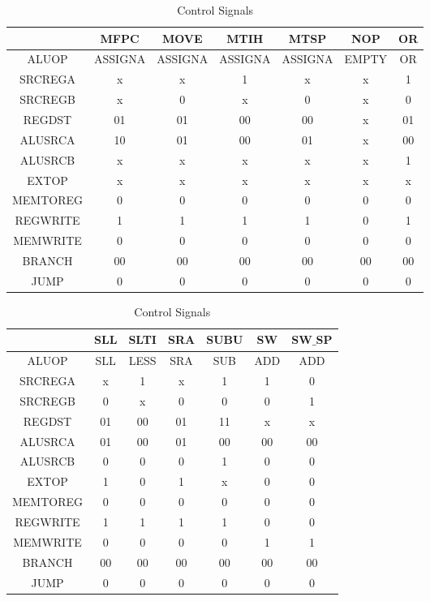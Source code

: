 \begin{center}
\begin{table}[H]
\caption{Control Signals}
\label{tab:treatments}
\begin{tabular}{|c|cccccc|}
\hline
& MFPC & MOVE & MTIH & MTSP & NOP & OR \\
\hline
ALUOP & ASSIGNA & ASSIGNA & ASSIGNA & ASSIGNA & EMPTY & OR\\	
\hline
SRCREGA & x & x & 1 & x & x & 1\\
\hline
SRCREGB & x & 0 & x & 0 & x & 0\\
\hline
REGDST & 01 & 01 & 00 & 00 & x & 01\\
\hline
ALUSRCA & 10 & 01 & 00 & 01 & x & 00\\
\hline
ALUSRCB & x & x & x & x & x & 1\\
\hline
EXTOP & x & x & x & x & x & x\\
\hline
MEMTOREG & 0 & 0 & 0 & 0 & 0 & 0\\
\hline
REGWRITE & 1 & 1 & 1 & 1 & 0 & 1\\
\hline
MEMWRITE & 0 & 0 & 0 & 0 & 0 & 0\\
\hline
BRANCH & 00 & 00 & 00 & 00 & 00 & 00\\
\hline
JUMP & 0 & 0 & 0 & 0 & 0 & 0\\
\hline
\end{tabular}
\end{table}
\end{center}


\begin{center}
\begin{table}[H]
\caption{Control Signals}
\label{tab:treatments}
\begin{tabular}{|c|cccccc|}
\hline
& SLL & SLTI & SRA & SUBU & SW & SW$\_$SP \\
\hline
ALUOP & SLL & LESS & SRA & SUB & ADD & ADD\\	
\hline
SRCREGA & x & 1 & x & 1 & 1 & 0\\
\hline
SRCREGB & 0 & x & 0 & 0 & 0 & 1\\
\hline
REGDST & 01 & 00 & 01 & 11 & x & x\\
\hline
ALUSRCA & 01 & 00 & 01 & 00 & 00 & 00\\
\hline
ALUSRCB & 0 & 0 & 0 & 1 & 0 & 0\\
\hline
EXTOP & 1 & 0 & 1 & x & 0 & 0\\
\hline
MEMTOREG & 0 & 0 & 0 & 0 & 0 & 0\\
\hline
REGWRITE & 1 & 1 & 1 & 1 & 0 & 0\\
\hline
MEMWRITE & 0 & 0 & 0 & 0 & 1 & 1\\
\hline
BRANCH & 00 & 00 & 00 & 00 & 00 & 00\\
\hline
JUMP & 0 & 0 & 0 & 0 & 0 & 0\\
\hline
\end{tabular}
\end{table}
\end{center}

